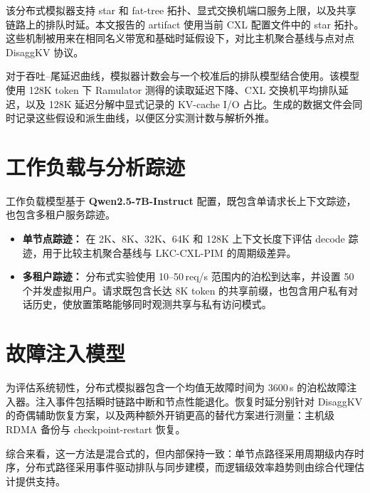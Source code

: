 该分布式模拟器支持 star 和 fat-tree 拓扑、显式交换机端口服务上限，以及共享链路上的排队时延。本文报告的 artifact 使用当前 CXL 配置文件中的 star 拓扑。这些机制被用来在相同名义带宽和基础时延假设下，对比主机聚合基线与点对点 DisaggKV 协议。

对于吞吐--尾延迟曲线，模拟器计数会与一个校准后的排队模型结合使用。该模型使用 128K token 下 Ramulator 测得的读取延迟下降、CXL 交换机平均排队延迟，以及 128K 延迟分解中显式记录的 KV-cache I/O 占比。生成的数据文件会同时记录这些假设和派生曲线，以便区分实测计数与解析外推。

\section{工作负载与分析踪迹}

工作负载模型基于 \textbf{Qwen2.5-7B-Instruct} 配置，既包含单请求长上下文踪迹，也包含多租户服务踪迹。
\begin{itemize}
    \item \textbf{单节点踪迹：} 在 2K、8K、32K、64K 和 128K 上下文长度下评估 decode 踪迹，用于比较主机聚合基线与 LKC-CXL-PIM 的周期级差异。
    \item \textbf{多租户踪迹：} 分布式实验使用 10--50\,req/s 范围内的泊松到达率，并设置 50 个并发虚拟用户。请求既包含长达 8K token 的共享前缀，也包含用户私有对话历史，使放置策略能够同时观测共享与私有访问模式。
\end{itemize}

\section{故障注入模型}

为评估系统韧性，分布式模拟器包含一个均值无故障时间为 3600\,s 的泊松故障注入器。注入事件包括瞬时链路中断和节点性能退化。恢复时延分别针对 DisaggKV 的奇偶辅助恢复方案，以及两种额外开销更高的替代方案进行测量：主机级 RDMA 备份与 checkpoint-restart 恢复。

综合来看，这一方法是混合式的，但内部保持一致：单节点路径采用周期级内存时序，分布式路径采用事件驱动排队与同步建模，而逻辑级效率趋势则由综合代理估计提供支持。
